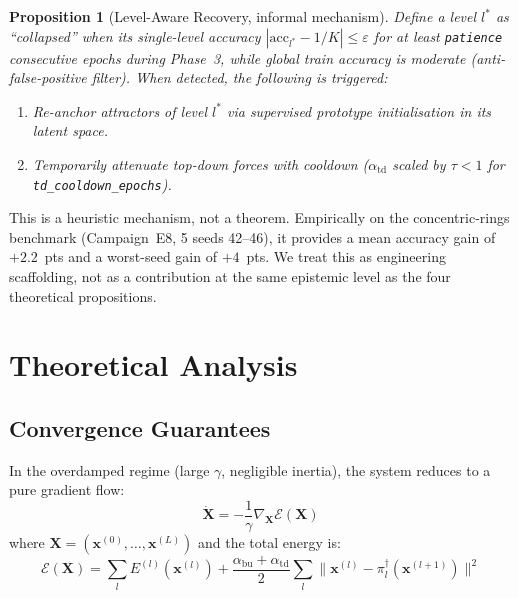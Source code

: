 \documentclass[11pt,a4paper]{article}
\newtheorem{proposition}[theorem]{Proposition}
\begin{document}
\begin{proposition}[Level-Aware Recovery, informal mechanism]
\label{prop:p6}
Define a level $l^*$ as ``collapsed'' when its single-level accuracy
$|\mathrm{acc}_{l^*} - 1/K| \le \varepsilon$ for at least \texttt{patience}
consecutive epochs during Phase~3, while global train accuracy is moderate
(anti-false-positive filter). When detected, the following is triggered:
\begin{enumerate}
  \item Re-anchor attractors of level $l^*$ via supervised prototype initialisation in
        its latent space.
  \item Temporarily attenuate top-down forces with cooldown ($\alpha_{\mathrm{td}}$ scaled
        by $\tau<1$ for \texttt{td\_cooldown\_epochs}).
\end{enumerate}
\end{proposition}

This is a heuristic mechanism, not a theorem. Empirically on the concentric-rings
benchmark (Campaign~E8, 5 seeds 42--46), it provides a mean accuracy gain of $+2.2$~pts
and a worst-seed gain of $+4$~pts. We treat this as engineering scaffolding, not as a
contribution at the same epistemic level as the four theoretical propositions.

\section{Theoretical Analysis}
\label{sec:theory}

\subsection{Convergence Guarantees}
\label{sec:theory:convergence}

In the overdamped regime (large $\gamma$, negligible inertia), the system reduces to a pure
gradient flow:
\begin{equation}
  \dot{\mathbf{X}} = -\frac{1}{\gamma}\nabla_{\mathbf{X}} \mathcal{E}(\mathbf{X})
\end{equation}
where $\mathbf{X} = (\mathbf{x}^{(0)}, \ldots, \mathbf{x}^{(L)})$ and the total energy is:
\begin{equation}
  \mathcal{E}(\mathbf{X}) = \sum_l E^{(l)}(\mathbf{x}^{(l)})
  + \frac{\alpha_{\mathrm{bu}} + \alpha_{\mathrm{td}}}{2}
    \sum_l \|\mathbf{x}^{(l)} - \pi_l^\dagger(\mathbf{x}^{(l+1)})\|^2
\label{eq:lyapunov}
\end{equation}
\end{document}
